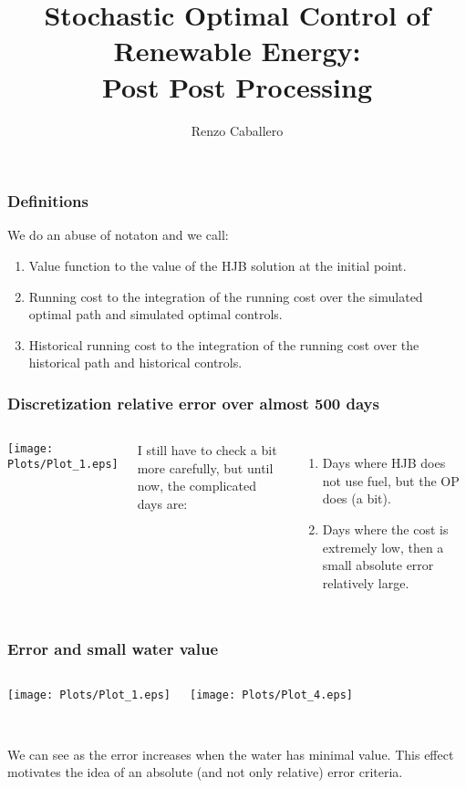 \documentclass[aspectratio=169]{beamer}
\title[SOC of Renewable Energy]{Stochastic Optimal Control of Renewable Energy:\\
Post Post Processing} %
\author{Renzo Caballero} %
\institute[KAUST] %
{renzo.caballerorosas@kaust.edu.sa\\
\quad\\
\medskip
Advisor: Professor Ra\'ul Tempone\\
}
\begin{document}
\begin{frame}
\titlepage %
\end{frame}


\begin{frame}
\frametitle{Definitions}

We do an abuse of notaton and we call:

\begin{enumerate}

\item \alert{Value function} to the value of the HJB solution at the initial point.

\item \alert{Running cost} to the integration of the running cost over the simulated optimal path and simulated optimal controls.

\item \alert{Historical running cost} to the integration of the running cost over the historical path and historical controls.

\end{enumerate}

\end{frame}


\begin{frame}
\frametitle{Discretization relative error over almost 500 days}
\begin{columns}[c]

\texttt{[image: Plots/Plot\_1.eps]}

I still have to check a bit more carefully, but until now, the complicated days are:
\begin{enumerate}

\item Days where HJB does not use fuel, but the OP does (a bit).
\item Days where the cost is extremely low, then a small absolute error relatively large.

\end{enumerate}

\end{columns}

\end{frame}


\begin{frame}
\frametitle{Error and small water value}
\begin{columns}[c]

\texttt{[image: Plots/Plot\_1.eps]}

\texttt{[image: Plots/Plot\_4.eps]}

\end{columns}
\quad\\
We can see as the error increases when the water has minimal value. This effect motivates the idea of an absolute (and not only relative) error criteria.

\end{frame}
\end{document}
